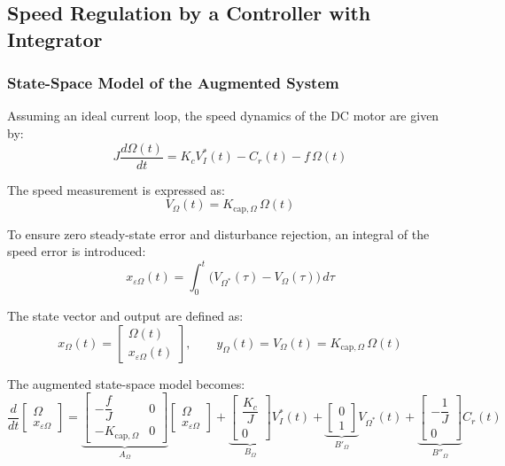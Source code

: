 \documentclass{rapportCS}
\begin{document}
\subsection{Speed Regulation by a Controller with Integrator}
\subsubsection{State-Space Model of the Augmented System}

Assuming an ideal current loop, the speed dynamics of the DC motor are given by:
\begin{equation*}
J\frac{d\Omega(t)}{dt} = K_c V_I^*(t) - C_r(t) - f\,\Omega(t)
\end{equation*}

The speed measurement is expressed as:
\begin{equation*}
V_\Omega(t) = K_{\mathrm{cap},\Omega}\,\Omega(t)
\end{equation*}

To ensure zero steady-state error and disturbance rejection, an integral of the speed error is introduced:
\begin{equation*}
x_{\varepsilon \Omega}(t) = \int_0^t \big(V_{\Omega^*}(\tau) - V_\Omega(\tau)\big)\,d\tau
\end{equation*}

The state vector and output are defined as:
\begin{equation*}
x_\Omega(t) =
\begin{bmatrix}
\Omega(t) \\[4pt]
x_{\varepsilon \Omega}(t)
\end{bmatrix},
\qquad
y_\Omega(t) = V_\Omega(t) = K_{\mathrm{cap},\Omega}\,\Omega(t)
\end{equation*}

The augmented state-space model becomes:
\begin{equation*}
\frac{d}{dt}
\begin{bmatrix}
\Omega \\[4pt]
x_{\varepsilon \Omega}
\end{bmatrix}
=
\underbrace{
\begin{bmatrix}
-\dfrac{f}{J} & 0 \\[6pt]
- K_{\mathrm{cap},\Omega} & 0
\end{bmatrix}}_{A_\Omega}
\begin{bmatrix}
\Omega \\[4pt]
x_{\varepsilon \Omega}
\end{bmatrix}
+
\underbrace{
\begin{bmatrix}
\dfrac{K_c}{J} \\[4pt]
0
\end{bmatrix}}_{B_\Omega}
V_I^*(t)
+
\underbrace{
\begin{bmatrix}
0 \\[4pt]
1
\end{bmatrix}}_{B'_\Omega}
V_{\Omega^*}(t)
+
\underbrace{
\begin{bmatrix}
-\dfrac{1}{J} \\[4pt]
0
\end{bmatrix}}_{B''_\Omega}
C_r(t)
\end{equation*}
\end{document}
